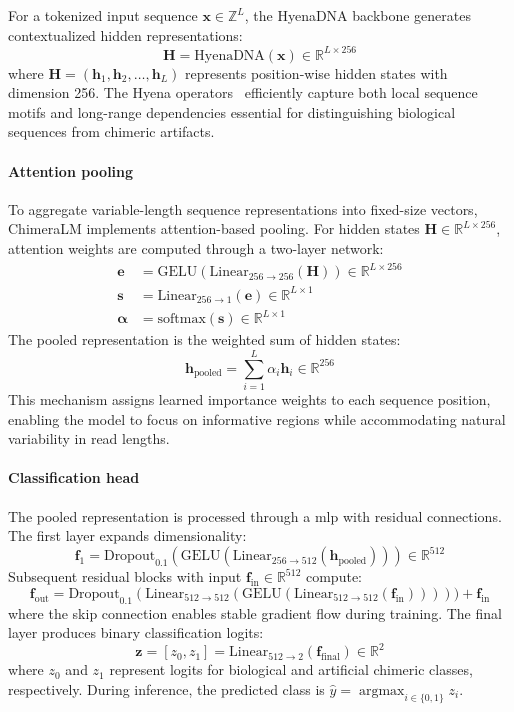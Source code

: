 \documentclass[pdflatex,sn-nature,lineno]{sn-jnl}%
\DeclareMathOperator*{\argmax}{argmax}
\theoremstyle{thmstyleone}%
\theoremstyle{thmstyletwo}%
\theoremstyle{thmstylethree}%
\begin{document}
For a tokenized input sequence $\mathbf{x} \in \mathbb{Z}^{L}$, the HyenaDNA backbone generates contextualized hidden representations:
$$
\mathbf{H} = \text{HyenaDNA}(\mathbf{x}) \in \mathbb{R}^{L \times 256}
$$
where $\mathbf{H} = (\mathbf{h}_1, \mathbf{h}_2, \ldots, \mathbf{h}_L)$ represents position-wise hidden states with dimension 256. 
The Hyena operators~\cite{Poli2023HyenaHT} efficiently capture both local sequence motifs and long-range dependencies essential for distinguishing biological sequences from chimeric artifacts.

\paragraph{Attention pooling}
To aggregate variable-length sequence representations into fixed-size vectors, ChimeraLM implements attention-based pooling. 
For hidden states $\mathbf{H} \in \mathbb{R}^{L \times 256}$, attention weights are computed through a two-layer network:
\begin{align*}
\mathbf{e} &= \text{GELU}(\text{Linear}_{256 \to 256}(\mathbf{H})) \in \mathbb{R}^{L \times 256} \\
\mathbf{s} &= \text{Linear}_{256 \to 1}(\mathbf{e}) \in \mathbb{R}^{L \times 1} \\
\boldsymbol{\alpha} &= \text{softmax}(\mathbf{s}) \in \mathbb{R}^{L \times 1}
\end{align*}
The pooled representation is the weighted sum of hidden states:
$$
\mathbf{h}_{\text{pooled}} = \sum_{i=1}^{L} \alpha_i \mathbf{h}_i \in \mathbb{R}^{256}
$$
This mechanism assigns learned importance weights to each sequence position, enabling the model to focus on informative regions while accommodating natural variability in read lengths.

\paragraph{Classification head}
The pooled representation is processed through a \gls{mlp} with residual connections.
The first layer expands dimensionality:
$$
\mathbf{f}_1 = \text{Dropout}_{0.1}(\text{GELU}(\text{Linear}_{256 \to 512}(\mathbf{h}_{\text{pooled}}))) \in \mathbb{R}^{512}
$$
Subsequent residual blocks with input $\mathbf{f}_{\text{in}} \in \mathbb{R}^{512}$ compute:
$$
\mathbf{f}_{\text{out}} = \text{Dropout}_{0.1}(\text{Linear}_{512 \to 512}(\text{GELU}(\text{Linear}_{512 \to 512}(\mathbf{f}_{\text{in}}))))) + \mathbf{f}_{\text{in}}
$$
where the skip connection enables stable gradient flow during training.
The final layer produces binary classification logits:
$$
\mathbf{z} = [z_0, z_1] = \text{Linear}_{512 \to 2}(\mathbf{f}_{\text{final}}) \in \mathbb{R}^{2}
$$
where $z_0$ and $z_1$ represent logits for biological and artificial chimeric classes, respectively. During inference, the predicted class is $\hat{y} = \argmax_{i \in \{0,1\}} z_i$.
\end{document}
